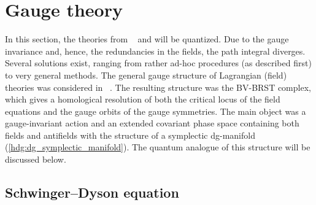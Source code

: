 \section{Gauge theory}\label{section:qft_gauge_theory}

    In this section, the theories from ~ and  will be quantized. Due to the gauge invariance and, hence, the redundancies in the fields, the path integral diverges. Several solutions exist, ranging from rather ad-hoc procedures (as described first) to very general methods. The general gauge structure of Lagrangian (field) theories was considered in ~. The resulting structure was the BV-BRST complex, which gives a homological resolution of both the critical locus of the field equations and the gauge orbits of the gauge symmetries. The main object was a gauge-invariant action and an extended covariant phase space containing both fields and antifields with the structure of a symplectic dg-manifold (\cref{hdg:dg_symplectic_manifold}). The quantum analogue of this structure will be discussed below.

\subsection{Schwinger--Dyson equation}

